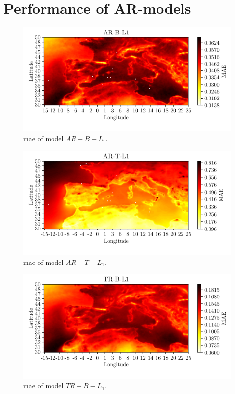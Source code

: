 \section{Performance of AR-models} \label{app:mae_plots}
\begin{figure}[ht]
    \centering
    \includegraphics{python_figs/mea_best_ar_model_tcc_L1_in_folder_AR-B-L1.png}
    \caption{\acrshort{mae} of model $AR-B-L_1$.}
    \label{fig:grid_mae_ARBL1}
\end{figure}
\begin{figure}[ht]
    \centering
        \includegraphics{python_figs/mea_best_ar_model_tcc_L1_in_folder_AR-T-L1.png}
    \caption{\acrshort{mae} of model $AR-T-L_1$.}
    \label{fig:grid_mae_AR-T-L1}
\end{figure}
\begin{figure}[ht]
    \centering
    \includegraphics{python_figs/mea_best_ar_model_tcc_L1_in_folder_TR-B-L1.png}
    \caption{\acrshort{mae} of model $TR-B-L_1$.}
    \label{fig:grid_mae_TRBL1}
\end{figure}
\cleardoublepage

